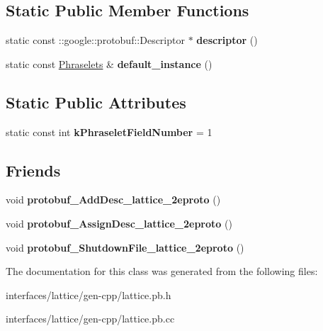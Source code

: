 \subsection*{Static Public Member Functions}
\begin{DoxyCompactItemize}
\item 
\hypertarget{classlattice_1_1Phraselets_ad7b7ac4457f6759574e37107a46d179c}{
static const ::google::protobuf::Descriptor $\ast$ {\bfseries descriptor} ()}
\label{classlattice_1_1Phraselets_ad7b7ac4457f6759574e37107a46d179c}

\item 
\hypertarget{classlattice_1_1Phraselets_a289431b64664e617c8c0a4fa7b66b1e4}{
static const \hyperlink{classlattice_1_1Phraselets}{Phraselets} \& {\bfseries default\_\-instance} ()}
\label{classlattice_1_1Phraselets_a289431b64664e617c8c0a4fa7b66b1e4}

\end{DoxyCompactItemize}
\subsection*{Static Public Attributes}
\begin{DoxyCompactItemize}
\item 
\hypertarget{classlattice_1_1Phraselets_ad69aa77b37a4d6f3d2c61fd9aaa09fd8}{
static const int {\bfseries kPhraseletFieldNumber} = 1}
\label{classlattice_1_1Phraselets_ad69aa77b37a4d6f3d2c61fd9aaa09fd8}

\end{DoxyCompactItemize}
\subsection*{Friends}
\begin{DoxyCompactItemize}
\item 
\hypertarget{classlattice_1_1Phraselets_a19e63fb37025879e023cad88064187cf}{
void {\bfseries protobuf\_\-AddDesc\_\-lattice\_\-2eproto} ()}
\label{classlattice_1_1Phraselets_a19e63fb37025879e023cad88064187cf}

\item 
\hypertarget{classlattice_1_1Phraselets_a3b0386e09a9fefcf1bdce658cfc480b2}{
void {\bfseries protobuf\_\-AssignDesc\_\-lattice\_\-2eproto} ()}
\label{classlattice_1_1Phraselets_a3b0386e09a9fefcf1bdce658cfc480b2}

\item 
\hypertarget{classlattice_1_1Phraselets_a3c7b187721d0704ceb19ff889729d35a}{
void {\bfseries protobuf\_\-ShutdownFile\_\-lattice\_\-2eproto} ()}
\label{classlattice_1_1Phraselets_a3c7b187721d0704ceb19ff889729d35a}

\end{DoxyCompactItemize}


The documentation for this class was generated from the following files:\begin{DoxyCompactItemize}
\item 
interfaces/lattice/gen-\/cpp/lattice.pb.h\item 
interfaces/lattice/gen-\/cpp/lattice.pb.cc\end{DoxyCompactItemize}
